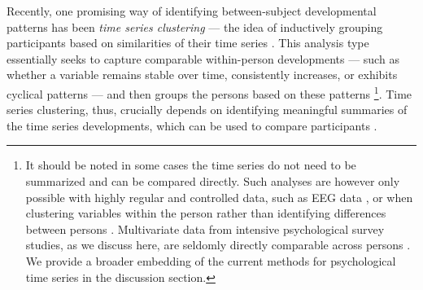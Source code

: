 \documentclass[man, 12pt, a4paper, floatsintext]{apa7}
\theoremstyle{break}
\theoremstyle{plain}
\begin{document}
Recently, one promising way of identifying between-subject developmental patterns has been \textit{time series clustering} --- the idea of inductively grouping participants based on similarities of their time series \citep{ariens2020}. This analysis type essentially seeks to capture comparable within-person developments --- such as whether a variable remains stable over time, consistently increases, or exhibits cyclical patterns --- and then groups the persons based on these patterns  \citep[][]{liao2005}\footnote{It should be noted in some cases the time series do not need to be summarized and can be compared directly. Such analyses are however only possible with highly regular and controlled data, such as EEG data \citep{huang1985}, or when clustering variables within the person rather than identifying differences between persons \citep{haslbeck2022}. Multivariate data from intensive psychological survey studies, as we discuss here, are seldomly directly comparable across persons \citep[e.g., ][]{faloutsos1994}. We provide a broader embedding of the current methods for psychological time series in the discussion section.}. Time series clustering, thus, crucially depends on identifying meaningful summaries of the time series developments, which can be used to compare participants \citep[][]{Aghabozorgi2015}. 
\end{document}
